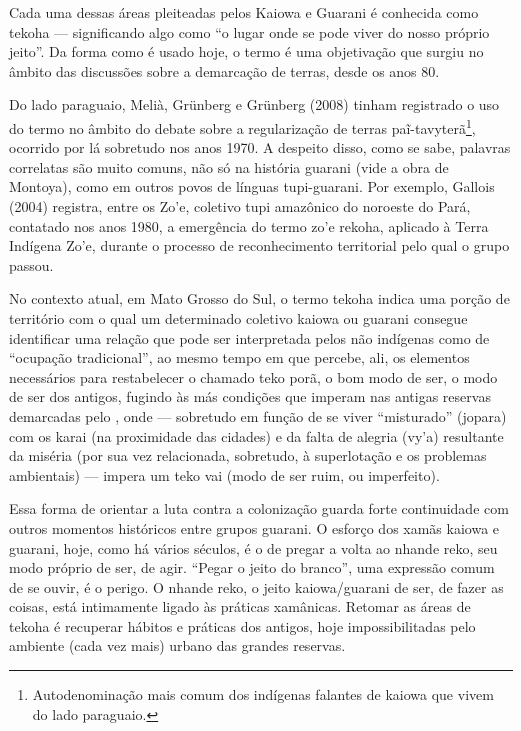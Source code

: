 Cada uma dessas áreas pleiteadas pelos Kaiowa e Guarani é conhecida como
tekoha — significando algo como ``o lugar onde se pode viver do nosso
próprio jeito''. Da forma como é usado hoje, o termo é uma objetivação
que surgiu no âmbito das discussões sobre a demarcação de terras, desde
os anos 80. 

Do lado paraguaio, Melià, Grünberg e Grünberg (2008) tinham registrado o
uso do termo no âmbito do debate sobre a regularização de terras
paĩ{}-tavyterã\footnote{Autodenominação mais comum dos indígenas
falantes de kaiowa que vivem do lado paraguaio.}, ocorrido por lá
sobretudo nos anos 1970. A despeito disso, como se sabe, palavras
correlatas são muito comuns, não só na história guarani (vide a obra de
Montoya), como em outros povos de línguas tupi-guarani. Por exemplo,
Gallois (2004) registra, entre os Zo’e, coletivo tupi amazônico do
noroeste do Pará, contatado nos anos 1980, a emergência do termo zo’e
rekoha, aplicado à Terra Indígena Zo’e, durante o processo de
reconhecimento territorial pelo qual o grupo passou. 

No contexto atual, em Mato Grosso do Sul, o termo tekoha indica uma
porção de território com o qual um determinado coletivo kaiowa ou
guarani consegue identificar uma relação que pode ser interpretada
pelos não indígenas como de ``ocupação tradicional'', ao mesmo tempo em
que percebe, ali, os elementos necessários para restabelecer o chamado
teko porã, o bom modo de ser, o modo de ser dos antigos, fugindo às más
condições que imperam nas antigas reservas demarcadas pelo , onde —
sobretudo em função de se viver ``misturado'' (jopara) com os karai (na
proximidade das cidades) e da falta de alegria (vy’a) resultante da
miséria (por sua vez relacionada, sobretudo, à superlotação e os
problemas ambientais) — impera um teko vai (modo de ser ruim, ou
imperfeito).

Essa forma de orientar a luta contra a colonização guarda forte
continuidade com outros momentos históricos entre grupos guarani. O
esforço dos xamãs kaiowa e guarani, hoje, como há vários séculos, é o
de pregar a volta ao nhande reko, seu modo próprio de ser, de agir.
``Pegar o jeito do branco'', uma expressão comum de se ouvir, é o perigo.
O nhande reko, o jeito kaiowa/guarani de ser, de fazer as coisas, está
intimamente ligado às práticas xamânicas. Retomar as áreas de tekoha é
recuperar hábitos e práticas dos antigos, hoje impossibilitadas pelo
ambiente (cada vez mais) urbano das grandes reservas.

